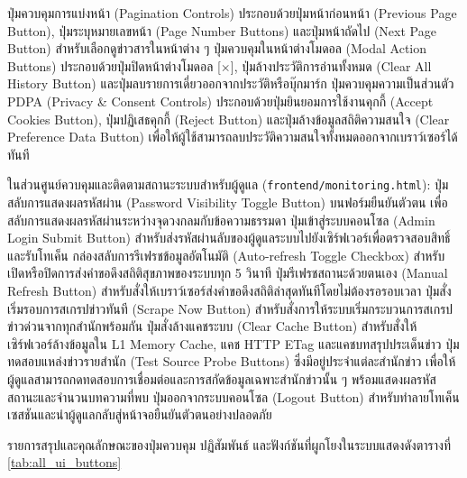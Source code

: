 ปุ่มควบคุมการแบ่งหน้า (Pagination Controls) ประกอบด้วยปุ่มหน้าก่อนหน้า (Previous Page Button), ปุ่มระบุหมายเลขหน้า (Page Number Buttons) และปุ่มหน้าถัดไป (Next Page Button) สำหรับเลือกดูข่าวสารในหน้าต่าง ๆ
ปุ่มควบคุมในหน้าต่างโมดอล (Modal Action Buttons) ประกอบด้วยปุ่มปิดหน้าต่างโมดอล [$\times$], ปุ่มล้างประวัติการอ่านทั้งหมด (Clear All History Button) และปุ่มลบรายการเดี่ยวออกจากประวัติหรือบุ๊กมาร์ก
ปุ่มควบคุมความเป็นส่วนตัว PDPA (Privacy \& Consent Controls) ประกอบด้วยปุ่มยินยอมการใช้งานคุกกี้ (Accept Cookies Button), ปุ่มปฏิเสธคุกกี้ (Reject Button) และปุ่มล้างข้อมูลสถิติความสนใจ (Clear Preference Data Button) เพื่อให้ผู้ใช้สามารถลบประวัติความสนใจทั้งหมดออกจากเบราว์เซอร์ได้ทันที

ในส่วนศูนย์ควบคุมและติดตามสถานะระบบสำหรับผู้ดูแล (\texttt{frontend/monitoring.html}):
ปุ่มสลับการแสดงผลรหัสผ่าน (Password Visibility Toggle Button) บนฟอร์มยืนยันตัวตน เพื่อสลับการแสดงผลรหัสผ่านระหว่างจุดวงกลมกับข้อความธรรมดา
ปุ่มเข้าสู่ระบบคอนโซล (Admin Login Submit Button) สำหรับส่งรหัสผ่านลับของผู้ดูแลระบบไปยังเซิร์ฟเวอร์เพื่อตรวจสอบสิทธิ์และรับโทเค็น
กล่องสลับการรีเฟรชข้อมูลอัตโนมัติ (Auto-refresh Toggle Checkbox) สำหรับเปิดหรือปิดการส่งคำขอดึงสถิติสุขภาพของระบบทุก 5 วินาที
ปุ่มรีเฟรชสถานะด้วยตนเอง (Manual Refresh Button) สำหรับสั่งให้เบราว์เซอร์ส่งคำขอดึงสถิติล่าสุดทันทีโดยไม่ต้องรอรอบเวลา
ปุ่มสั่งเริ่มรอบการสเกรปข่าวทันที (Scrape Now Button) สำหรับสั่งการให้ระบบเริ่มกระบวนการสเกรปข่าวด่วนจากทุกสำนักพร้อมกัน
ปุ่มสั่งล้างแคชระบบ (Clear Cache Button) สำหรับสั่งให้เซิร์ฟเวอร์ล้างข้อมูลใน L1 Memory Cache, แคช HTTP ETag และแคชบทสรุปประเด็นข่าว
ปุ่มทดสอบแหล่งข่าวรายสำนัก (Test Source Probe Buttons) ซึ่งมีอยู่ประจำแต่ละสำนักข่าว เพื่อให้ผู้ดูแลสามารถกดทดสอบการเชื่อมต่อและการสกัดข้อมูลเฉพาะสำนักข่าวนั้น ๆ พร้อมแสดงผลรหัสสถานะและจำนวนบทความที่พบ
ปุ่มออกจากระบบคอนโซล (Logout Button) สำหรับทำลายโทเค็นเซสชันและนำผู้ดูแลกลับสู่หน้าจอยืนยันตัวตนอย่างปลอดภัย

รายการสรุปและคุณลักษณะของปุ่มควบคุม ปฏิสัมพันธ์ และฟังก์ชันที่ผูกโยงในระบบแสดงดังตารางที่ \ref{tab:all_ui_buttons}

